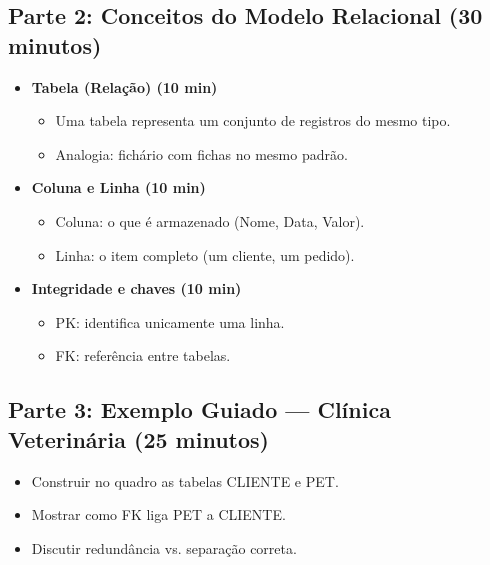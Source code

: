 \documentclass[12pt,a4paper]{article}
\begin{document}
\subsection*{Parte 2: Conceitos do Modelo Relacional (30 minutos)}
\begin{itemize}[leftmargin=*,itemsep=0.35em]
  \item \textbf{Tabela (Relação) (10 min)}
  \begin{itemize}[leftmargin=*,itemsep=0.25em]
    \item Uma tabela representa um conjunto de registros do mesmo tipo.
    \item Analogia: fichário com fichas no mesmo padrão.
  \end{itemize}
  \item \textbf{Coluna e Linha (10 min)}
  \begin{itemize}[leftmargin=*,itemsep=0.25em]
    \item Coluna: o que é armazenado (Nome, Data, Valor).
    \item Linha: o item completo (um cliente, um pedido).
  \end{itemize}
  \item \textbf{Integridade e chaves (10 min)}
  \begin{itemize}[leftmargin=*,itemsep=0.25em]
    \item PK: identifica unicamente uma linha.
    \item FK: referência entre tabelas.
  \end{itemize}
\end{itemize}

\subsection*{Parte 3: Exemplo Guiado --- Clínica Veterinária (25 minutos)}
\begin{itemize}[leftmargin=*,itemsep=0.35em]
  \item Construir no quadro as tabelas CLIENTE e PET.
  \item Mostrar como FK liga PET a CLIENTE.
  \item Discutir redundância vs. separação correta.
\end{itemize}
\end{document}
